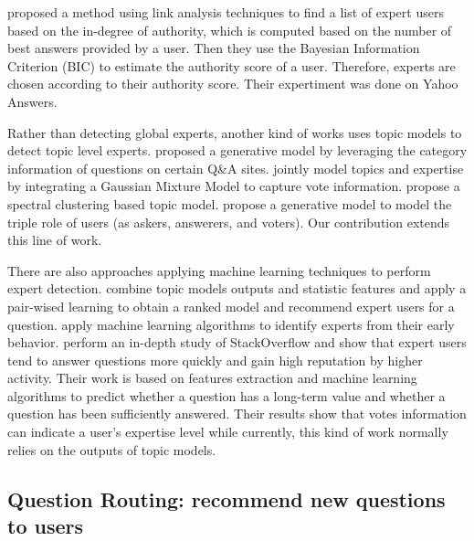 \cite{chp2Bouguessa:2008:Identify:authority:indegree} proposed a method using link analysis techniques to find a list of expert users based on the in-degree of authority, which is computed based on the number of best answers provided by a user. Then they use the Bayesian Information Criterion (BIC) to estimate the authority score of a user. Therefore, experts are chosen according to their authority score. Their expertiment was done on Yahoo Answers.


Rather than detecting global experts, another kind of works uses topic models to detect topic level experts. \cite{guo2008tapping} proposed a generative model by leveraging the category information of questions on certain Q\&A sites. \cite{yang2013cqarank} jointly model topics and expertise by  integrating a Gaussian Mixture Model to capture vote information. \cite{Chang:2013} propose a spectral clustering based topic model. 
\cite{ma2015tri} propose a generative model to model the triple role of users (as askers, answerers, and voters). Our contribution extends this line of work. 

There are also approaches applying machine learning techniques to perform expert detection. \cite{ji2013learning} combine topic models outputs and statistic features and apply a pair-wised learning to obtain a ranked model and recommend expert users for a question. \cite{pal2011early} apply machine learning algorithms to identify experts from their early behavior. \cite{anderson2012discovering} perform an in-depth study of StackOverflow and show that expert users tend to answer questions more quickly and gain high reputation by higher activity. Their work is based on features extraction and machine learning algorithms to predict whether a question has a long-term value and whether a question has been sufficiently answered. Their results show that votes information can indicate a user's expertise level while currently, this kind of work normally relies on the outputs of topic models.

\subsection{Question Routing: recommend new questions to users}

